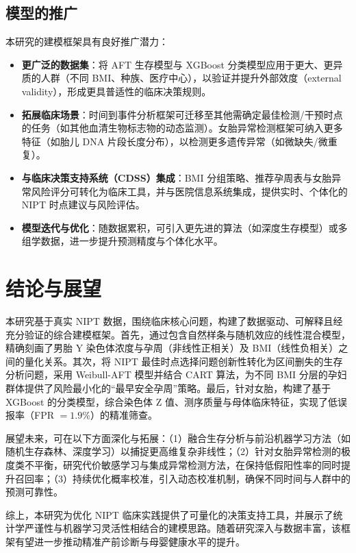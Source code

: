 \documentclass[withoutpreface]{cumcmthesis}
\begin{document}
\subsection{模型的推广}

本研究的建模框架具有良好推广潜力：
\begin{itemize}
    \item \textbf{更广泛的数据集}：将 AFT 生存模型与 XGBoost 分类模型应用于更大、更异质的人群（不同 BMI、种族、医疗中心），以验证并提升外部效度（external validity），形成更具普适性的临床决策规则。
    \item \textbf{拓展临床场景}：时间到事件分析框架可迁移至其他需确定最佳检测/干预时点的任务（如其他血清生物标志物的动态监测）。女胎异常检测框架可纳入更多特征（如胎儿 DNA 片段长度分布），以检测更多遗传异常（如微缺失/微重复）。
    \item \textbf{与临床决策支持系统（CDSS）集成}：BMI 分组策略、推荐孕周表与女胎异常风险评分可转化为临床工具，并与医院信息系统集成，提供实时、个体化的 NIPT 时点建议与风险评估。
    \item \textbf{模型迭代与优化}：随数据累积，可引入更先进的算法（如深度生存模型）或多组学数据，进一步提升预测精度与个体化水平。
\end{itemize}

\section{结论与展望}

本研究基于真实 NIPT 数据，围绕临床核心问题，构建了数据驱动、可解释且经充分验证的综合建模框架。首先，通过包含自然样条与随机效应的线性混合模型，精确刻画了男胎 Y 染色体浓度与孕周（非线性正相关）及 BMI（线性负相关）之间的量化关系。其次，将 NIPT 最佳时点选择问题创新性转化为区间删失的生存分析问题，采用 Weibull-AFT 模型并结合 CART 算法，为不同 BMI 分层的孕妇群体提供了风险最小化的“最早安全孕周”策略。最后，针对女胎，构建了基于 XGBoost 的分类模型，综合染色体 Z 值、测序质量与母体临床特征，实现了低误报率（FPR $=1.9\%$）的精准筛查。

展望未来，可在以下方面深化与拓展：（1）融合生存分析与前沿机器学习方法（如随机生存森林、深度学习）以捕捉更高维复杂非线性；（2）针对女胎异常检测的极度类不平衡，研究代价敏感学习与集成异常检测方法，在保持低假阳性率的同时提升召回率；（3）持续优化概率校准，引入动态校准机制，确保不同时间与人群中的预测可靠性。

综上，本研究为优化 NIPT 临床实践提供了可量化的决策支持工具，并展示了统计学严谨性与机器学习灵活性相结合的建模思路。随着研究深入与数据丰富，该框架有望进一步推动精准产前诊断与母婴健康水平的提升。
\end{document}
